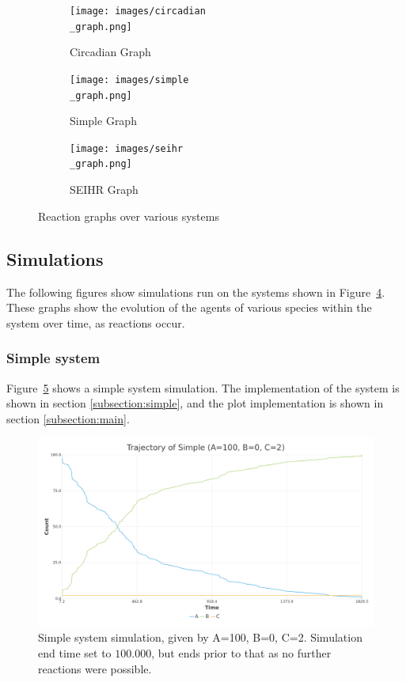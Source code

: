 \begin{figure}[H]
\centering
\begin{subfigure}{.3\textwidth}
  \centering
  \texttt{[image: images/circadian\\\_graph.png]}
  \caption{Circadian Graph}
  \label{fig:circadian}
\end{subfigure}%
\begin{subfigure}{.3\textwidth}
  \centering
  \texttt{[image: images/simple\\\_graph.png]}
  \caption{Simple Graph}
  \label{fig:simple}
\end{subfigure}
\begin{subfigure}{.3\textwidth}
  \centering
  \texttt{[image: images/seihr\\\_graph.png]}
  \caption{SEIHR Graph}
  \label{fig:seihr}
\end{subfigure}
\caption{Reaction graphs over various systems}
\label{fig:graphs}
\end{figure}

\subsection{Simulations}
The following figures show simulations run on the systems shown in Figure~\ref{fig:graphs}.
These graphs show the evolution of the agents of various species within the system over time, as reactions occur.

\subsubsection{Simple system}
Figure~\ref{fig:simple_sim} shows a simple system simulation.
The implementation of the system is shown in section \ref{subsection:simple}, and the plot implementation is shown in section \ref{subsection:main}.

\begin{figure}[H]
\centering
\includegraphics[width=1\textwidth,height=\textheight,keepaspectratio]{images/simple.png}
\caption{Simple system simulation, given by A=100, B=0, C=2. Simulation end time set to $100.000$, but ends prior to that as no further reactions were possible.}
\label{fig:simple_sim}
\end{figure}

